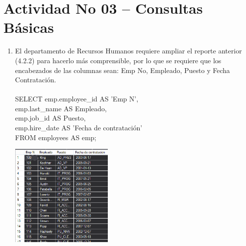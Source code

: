 \section{Actividad No 03 – Consultas B\'asicas} 
		
\begin{enumerate}[1.]
	\item El departamento de Recursos Humanos requiere ampliar el reporte anterior (4.2.2) para hacerlo m\'as comprensible, por lo que se requiere que los encabezados de las columnas sean: Emp No, Empleado, Puesto y Fecha Contrataci\'on.
	\\
	\\SELECT emp.employee\_id AS 'Emp N', \\
	   emp.last\_name AS Empleado, \\
	   emp.job\_id AS Puesto, \\
	   emp.hire\_date AS 'Fecha de contrataci\'on' \\
	FROM employees AS emp; \\
	\begin{center}
	\includegraphics[width=5cm]{./Imagenes/431} 
	\end{center}


\end{enumerate}
